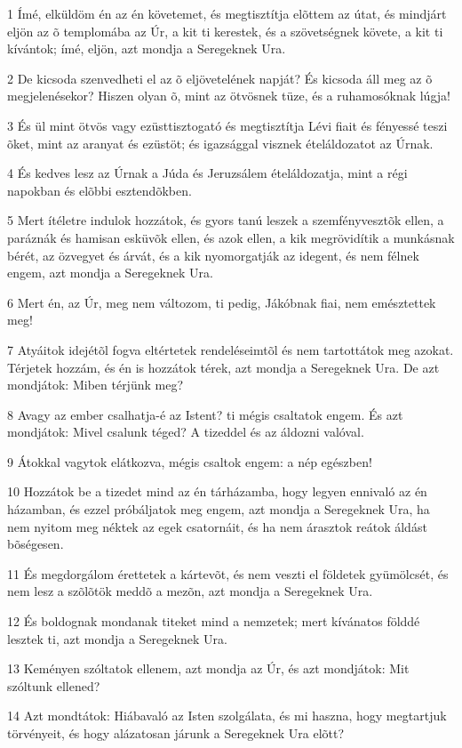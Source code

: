 \par 1 Ímé, elküldöm én az én követemet, és megtisztítja elõttem az útat, és mindjárt eljön az õ templomába az Úr,  a kit ti kerestek, és a szövetségnek követe, a kit ti kívántok; ímé, eljön, azt mondja a Seregeknek Ura.
\par 2 De kicsoda szenvedheti el az õ eljövetelének napját? És kicsoda áll meg az õ megjelenésekor? Hiszen olyan õ, mint az ötvösnek tüze, és a ruhamosóknak lúgja!
\par 3 És ül mint ötvös vagy ezüsttisztogató és megtisztítja Lévi fiait és fényessé teszi õket, mint az aranyat és ezüstöt; és igazsággal visznek ételáldozatot az Úrnak.
\par 4 És kedves lesz az Úrnak a Júda és Jeruzsálem ételáldozatja, mint a régi napokban és elõbbi esztendõkben.
\par 5 Mert ítéletre indulok hozzátok, és gyors tanú leszek a szemfényvesztõk ellen, a paráznák és hamisan esküvõk ellen, és azok ellen, a kik megrövidítik a munkásnak bérét, az özvegyet és árvát, és a kik nyomorgatják az idegent, és nem félnek engem, azt mondja a Seregeknek Ura.
\par 6 Mert én, az Úr, meg nem változom, ti pedig, Jákóbnak fiai, nem emésztettek meg!
\par 7 Atyáitok idejétõl fogva eltértetek rendeléseimtõl és nem tartottátok meg azokat. Térjetek hozzám, és én is hozzátok térek, azt mondja a Seregeknek Ura. De azt mondjátok: Miben térjünk meg?
\par 8 Avagy az ember csalhatja-é az Istent? ti mégis csaltatok engem. És azt mondjátok: Mivel csalunk téged? A tizeddel és az áldozni valóval.
\par 9 Átokkal vagytok elátkozva, mégis csaltok engem: a nép egészben!
\par 10 Hozzátok be a tizedet mind az én tárházamba, hogy legyen ennivaló az én házamban, és ezzel próbáljatok meg engem, azt mondja a Seregeknek Ura, ha nem nyitom meg néktek az egek csatornáit, és ha nem árasztok reátok áldást bõségesen.
\par 11 És megdorgálom érettetek a kártevõt, és nem veszti el földetek gyümölcsét, és nem lesz a szõlõtök meddõ a mezõn, azt mondja a Seregeknek Ura.
\par 12 És boldognak mondanak titeket mind a nemzetek; mert kívánatos földdé lesztek ti, azt mondja a Seregeknek Ura.
\par 13 Keményen szóltatok ellenem, azt mondja az Úr, és azt mondjátok: Mit szóltunk ellened?
\par 14 Azt mondtátok: Hiábavaló az Isten szolgálata, és mi haszna, hogy megtartjuk törvényeit, és hogy alázatosan járunk a Seregeknek Ura elõtt?

